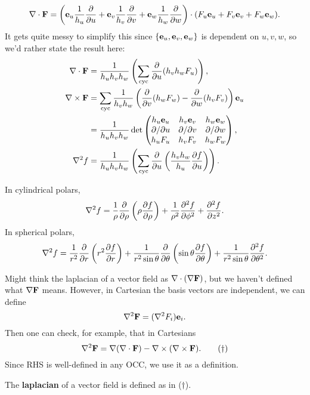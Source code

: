 \[
    \nabla\cdot {\bf F} = \left( {\bf e}_u \frac{1}{h_u}\frac{\partial }{\partial u} +{\bf e}_v \frac{1}{h_v}\frac{\partial }{\partial v}+{\bf e}_w \frac{1}{h_w}\frac{\partial }{\partial w}\right)\cdot (F_u{\bf e}_u+F_v{\bf e}_v+F_w{\bf e}_w).
\]
It gets quite messy to simplify this since $ \{{\bf e}_u,{\bf e}_v,{\bf e}_w\} $ is dependent on $u,v,w$, so we'd rather state the result here:
\begin{align*}
    \div \bfF&=\frac{1}{h_uh_vh_w}\left(\sum_{\text{cyc}} \frac{\partial }{\partial u}(h_vh_wF_u)\right),\\ 
    \curl \bfF &= \sum_{\text{cyc}} \frac{1}{h_vh_w}\left( \frac{\partial }{\partial v}(h_wF_w)-\frac{\partial }{\partial w}(h_vF_v)   \right)\bfe_u\\ 
    &= \frac{1}{h_uh_vh_w}\det \begin{pmatrix}
        h_u\bfe_u & h_v\bfe_v & h_w\bfe_w \\
        \partial /\partial u  & \partial /\partial v & \partial /\partial w \\
        h_uF_u & h_vF_v & h_wF_w \\
    \end{pmatrix},\\ 
    \laplacian f &= \frac{1}{h_uh_vh_w}\left( \sum_{\text{cyc}}\frac{\partial }{\partial u}\left( \frac{h_vh_w}{h_u}\frac{\partial f}{\partial u}  \right)  \right).
\end{align*}

\begin{example}
    In cylindrical polars,
    \[
        \laplacian f = \frac{1}{\rho} \frac{\partial }{\partial \rho}\left( \rho \frac{\partial f}{\partial \rho}  \right) +\frac{1}{\rho^2}\frac{\partial ^2 f}{\partial \phi^2} +\frac{\partial ^2f}{\partial z^2}. 
    \]
    In spherical polars,
    \[
        \laplacian f = \frac{1}{r^2}\frac{\partial }{\partial r}\left( r^2 \frac{\partial f}{\partial r} \right)+\frac{1}{r^2\sin \theta}\frac{\partial }{\partial \theta}\left( \sin\theta\frac{\partial f}{\partial \theta}  \right)+\frac{1}{r^2\sin\theta}\frac{\partial ^2 f}{\partial \theta^2}.   
    \]
\end{example}

Might think the laplacian of a vector field as $ \nabla\cdot (\nabla {\bf F}) $, but we haven't defined what $ \nabla {\bf F} $ means. However, in Cartesian the basis vectors are independent, we can define 
\[
    \laplacian \bfF = (\laplacian F_i) \bfe_i.
\]
Then one can check, for example, that in Cartesians
\[
    \laplacian \mathbf{F} = \nabla (\div \bfF) - \curl (\curl \bfF).\tag{$\dagger$}
\]
Since RHS is well-defined in any OCC, we use it as a definition.
\begin{definition}
    The \textbf{laplacian} of a vector field is defined as in ($\dagger$).
\end{definition}

